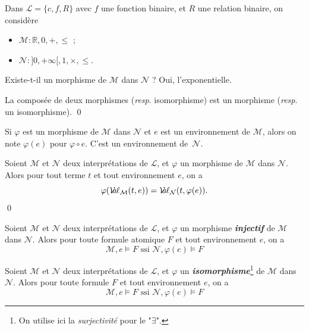 \documentclass[./main]{subfiles}
\begin{document}
  \begin{exm}
    Dans $\mathcal{L} = \{c, f, R\}$ avec $f$ une fonction binaire, et $R$ une relation binaire, on considère 
    \begin{itemize}
      \item $\mathcal{M} : \mathds{R}, 0, +, \le$ ;
      \item $\mathcal{N} : {]{0,+\infty}[}, 1, \times , \le$.
    \end{itemize}
    Existe-t-il un morphisme de $\mathcal{M}$ dans $\mathcal{N}$ ?
    Oui, l'exponentielle.
  \end{exm}

  \begin{prop}
    La composée de deux morphismes (\textit{resp}. isomorphisme) est un morphisme (\textit{resp}. un isomorphisme).
    \qed
  \end{prop}

  \begin{nota}
    Si $\varphi$ est un morphisme de $\mathcal{M}$ dans $\mathcal{N}$ et $e$ est un environnement de $\mathcal{M}$,
    alors on note $\varphi(e)$ pour  $\varphi \circ e$. C'est un environnement de~$\mathcal{N}$.
  \end{nota}

  \begin{lem}
    Soient $\mathcal{M}$ et $\mathcal{N}$ deux interprétations de $\mathcal{L}$, et $\varphi$ un morphisme de $\mathcal{M}$ dans $\mathcal{N}$. Alors pour tout terme $t$ et tout environnement $e$, on a \[
    \varphi(\mathcal{V}\hspace{-3.5pt}a\hspace{-0.5pt}\ell_{\mathcal{M}}(t, e)) = \mathcal{V}\hspace{-3.5pt}a\hspace{-0.5pt}\ell_{\mathcal{N}}(t, \varphi(e))
    .\]
    \qed
  \end{lem}

  \begin{lem}
    Soient $\mathcal{M}$ et $\mathcal{N}$ deux interprétations de $\mathcal{L}$, et $\varphi$ un morphisme \textit{\textbf{injectif}} de $\mathcal{M}$ dans $\mathcal{N}$. Alors pour toute formule atomique $F$ et tout environnement $e$, on a \[
      \mathcal{M}, e \models F \text{ ssi } \mathcal{N}, \varphi(e) \models F
    \]
  \end{lem}

  \begin{lem}
    Soient $\mathcal{M}$ et $\mathcal{N}$ deux interprétations de $\mathcal{L}$, et $\varphi$ un \textit{\textbf{isomorphisme}}\footnote{On utilise ici la \textit{surjectivité} pour le "$\exists $".} de $\mathcal{M}$ dans $\mathcal{N}$. Alors pour toute formule $F$ et tout environnement $e$, on a \[
      \mathcal{M}, e \models F \text{ ssi } \mathcal{N}, \varphi(e) \models F
    \]
  \end{lem}
\end{document}
